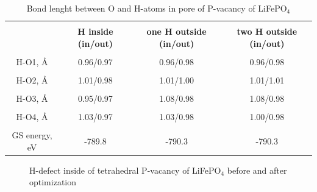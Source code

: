 \begin{table}[h]
\scriptsize{
\caption{Bond lenght between O and H-atoms in pore of P-vacancy of LiFePO$_4$}
\label{Ppos1}
\begin{center}
\begin{tabular}{|c|c|c|c|}
\hline
& & & \\
 \textbf{ } & \textbf{H inside (in/out)}& \textbf{one H outside (in/out)} & \textbf{two H outside (in/out)} \\ 
\hline
& & & \\
H-O1, \AA & 0.96/0.97 & 0.96/0.98 & 0.96/0.98 \\ 
\hline
& & & \\
H-O2, \AA & 1.01/0.98 & 1.01/1.00 & 1.01/1.01 \\
\hline
& & & \\
H-O3, \AA & 0.95/0.97 & 1.08/0.98  & 1.08/0.98  \\
\hline
& & & \\
H-O4, \AA & 1.03/0.97 & 1.03/0.98 & 1.00/0.98 \\
\hline
& & & \\
GS energy, eV & -789.8 & -790.3 & -790.3 \\
\hline
\end{tabular}
\end{center}
}
\end{table}

\begin{figure}[h]
\begin{minipage}[h]{0.48\linewidth}
\end{minipage}
\hfill
\begin{minipage}[h]{0.48\linewidth}
\end{minipage}
\caption{H-defect inside of tetrahedral P-vacancy of LiFePO$_4$ before and after optimization}
\label{h21}
\end{figure}

